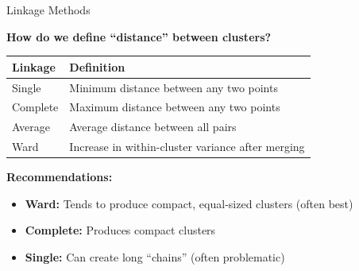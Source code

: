 \documentclass[10pt]{beamer}
\newcommand{\highlight}[1]{\textcolor{AccentOrange}{\textbf{#1}}}
\begin{document}
\begin{frame}{Linkage Methods}

  \highlight{How do we define ``distance'' between clusters?}

  \vspace{1em}
  \begin{center}
  \begin{tabular}{lp{7cm}}
    \toprule
    \textbf{Linkage} & \textbf{Definition} \\
    \midrule
    Single & Minimum distance between any two points \\
    \addlinespace
    Complete & Maximum distance between any two points \\
    \addlinespace
    Average & Average distance between all pairs \\
    \addlinespace
    Ward & Increase in within-cluster variance after merging \\
    \bottomrule
  \end{tabular}
  \end{center}

  \vspace{1em}
  \textbf{Recommendations:}
  \begin{itemize}
    \item \textbf{Ward:} Tends to produce compact, equal-sized clusters (often best)
    \item \textbf{Complete:} Produces compact clusters
    \item \textbf{Single:} Can create long ``chains'' (often problematic)
  \end{itemize}
\end{frame}

\end{document}
